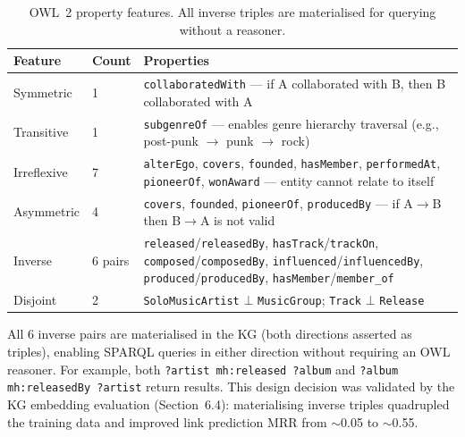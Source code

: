 \begin{table}[h]
\centering
\small
\begin{tabular}{llp{7cm}}
\toprule
\textbf{Feature} & \textbf{Count} & \textbf{Properties} \\
\midrule
Symmetric & 1 & \texttt{collaboratedWith} --- if A collaborated with B, then B collaborated with A \\
Transitive & 1 & \texttt{subgenreOf} --- enables genre hierarchy traversal (e.g., post-punk $\rightarrow$ punk $\rightarrow$ rock) \\
Irreflexive & 7 & \texttt{alterEgo}, \texttt{covers}, \texttt{founded}, \texttt{hasMember}, \texttt{performedAt}, \texttt{pioneerOf}, \texttt{wonAward} --- entity cannot relate to itself \\
Asymmetric & 4 & \texttt{covers}, \texttt{founded}, \texttt{pioneerOf}, \texttt{producedBy} --- if A$\rightarrow$B then B$\rightarrow$A is not valid \\
Inverse & 6 pairs & \texttt{released}/\texttt{releasedBy}, \texttt{hasTrack}/\texttt{trackOn}, \texttt{composed}/\texttt{composedBy}, \texttt{influenced}/\texttt{influencedBy}, \texttt{produced}/\texttt{producedBy}, \texttt{hasMember}/\texttt{member\_of} \\
Disjoint & 2 & \texttt{SoloMusicArtist} $\bot$ \texttt{MusicGroup}; \texttt{Track} $\bot$ \texttt{Release} \\
\bottomrule
\end{tabular}
\caption{OWL~2 property features. All inverse triples are materialised for querying without a reasoner.}
\end{table}

All 6 inverse pairs are materialised in the KG (both directions asserted as triples), enabling SPARQL queries in either direction without requiring an OWL reasoner. For example, both \texttt{?artist mh:released ?album} and \texttt{?album mh:releasedBy ?artist} return results. This design decision was validated by the KG embedding evaluation (Section~6.4): materialising inverse triples quadrupled the training data and improved link prediction MRR from $\sim$0.05 to $\sim$0.55.
